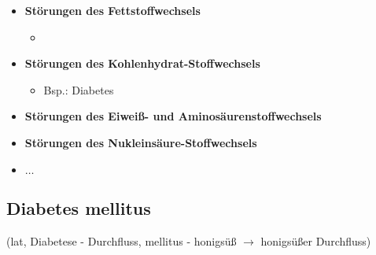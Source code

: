 \begin{itemize}
\begin{itemize}
				\item \textbf{Störungen des Fettstoffwechsels}
					\begin{itemize}
						\item 
					\end{itemize}
				\item \textbf{Störungen des Kohlenhydrat-Stoffwechsels}
					\begin{itemize}
						\item Bsp.: Diabetes
					\end{itemize}
				\item \textbf{Störungen des Eiweiß- und Aminosäurenstoffwechsels}
				\item \textbf{Störungen des Nukleinsäure-Stoffwechsels}
				\item \textbf{$\dots$}
			\end{itemize}
	\end{itemize}
\pagebreak
\subsection{Diabetes mellitus} (lat, Diabetese - Durchfluss, mellitus - honigsüß $\rightarrow$ honigsüßer Durchfluss)
